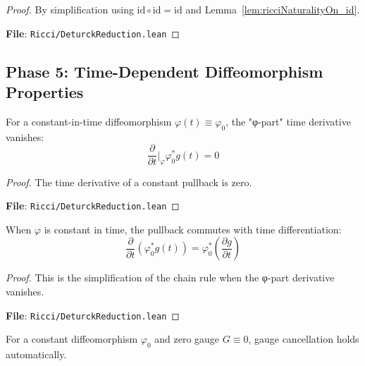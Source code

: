 \begin{proof}
\leanok
{}
By simplification using $\mathrm{id} \circ \mathrm{id} = \mathrm{id}$ and Lemma~\ref{lem:ricciNaturalityOn_id}.

\textbf{File}: \texttt{Ricci/DeturckReduction.lean}
\end{proof}

\subsection{Phase 5: Time-Dependent Diffeomorphism Properties}

\begin{lemma}
\label{lem:dPullback_dt_const}
\leanok
For a constant-in-time diffeomorphism $\varphi(t) \equiv \varphi_0$, the "φ-part" time derivative vanishes:
\[ \frac{\partial}{\partial t}\big|_{\varphi}\varphi_0^* g(t) = 0 \]
\end{lemma}

\begin{proof}
\leanok
{}
The time derivative of a constant pullback is zero.

\textbf{File}: \texttt{Ricci/DeturckReduction.lean}
\end{proof}

\begin{lemma}
\label{lem:pullbackChainRuleOn_const_simplified}
When $\varphi$ is constant in time, the pullback commutes with time differentiation:
\[ \frac{\partial}{\partial t}(\varphi_0^* g(t)) = \varphi_0^*\left(\frac{\partial g}{\partial t}\right) \]
\end{lemma}

\begin{proof}
This is the simplification of the chain rule when the φ-part derivative vanishes.

\textbf{File}: \texttt{Ricci/DeturckReduction.lean}
\end{proof}

\begin{lemma}
\label{lem:gaugeCancellationOn_const_zero}
For a constant diffeomorphism $\varphi_0$ and zero gauge $G \equiv 0$, gauge cancellation holds automatically.
\end{lemma}

